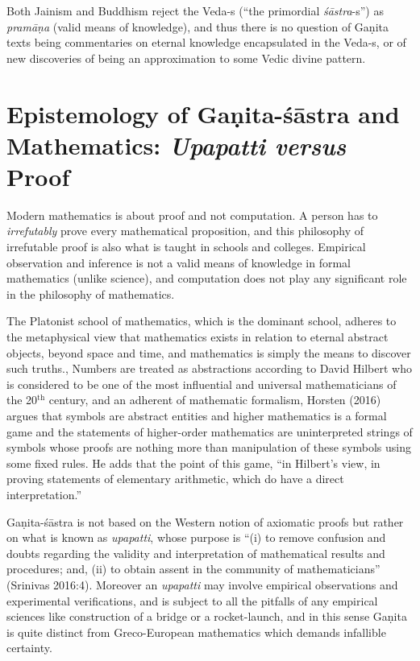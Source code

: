 Both Jainism and Buddhism reject the Veda-s (``the primordial {\sl śās\-tra}-s'') as {\sl pramāṇa} (valid means of knowledge), and thus there is no question of Gaṇita texts being commentaries on eternal knowledge encapsulated in the Veda-s, or of new discoveries of being an approximation to some Vedic divine pattern.

\section*{Epistemology of Gaṇita-śāstra and Mathematics: {\sl\bfseries Upapatti versus} Proof}

Modern mathematics is about proof and not computation. A person has to {\sl irrefutably} prove every mathematical proposition, and this philosophy of irrefutable proof is also what is taught in schools and colleges. Empirical observation and inference is not a valid means of knowledge in formal mathematics (unlike science), and computation does not play any significant role in the philosophy of mathematics. 

The Platonist school of mathematics, which is the dominant school, adheres to the metaphysical view that mathematics exists in relation to eternal abstract objects, beyond space and time, and mathematics is simply the means to discover such truths., Numbers are treated as abstractions according to David Hilbert who is considered to be one of the most influential and universal mathematicians of the 20$^{\text{th}}$ century, and an adherent of mathematic formalism, Horsten (2016) argues that symbols are abstract entities and higher mathematics is a formal game and the statements of higher-order mathematics are uninterpreted strings of symbols whose proofs are nothing more than manipulation of these symbols using some fixed rules. He adds that the point of this game, “in Hilbert's view, in proving statements of elementary arithmetic, which do have a direct interpretation.”

Gaṇita-śāstra is not based on the Western notion of axiomatic proofs but rather on what is known as {\sl upapatti}, whose purpose is ``(i) to remove confusion and doubts regarding the validity and interpretation of mathematical results and procedures; and, (ii) to obtain assent in the community of mathematicians'' (Srinivas 2016:4). Moreover an {\sl upapatti} may involve empirical observations and experimental verifications, and is subject to all the pitfalls of any empirical sciences like construction of a bridge or a rocket-launch, and in this sense Gaṇita is quite distinct from Greco-European mathematics which demands infallible certainty.


